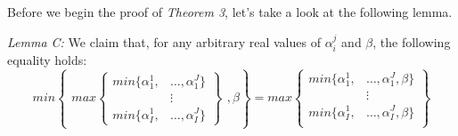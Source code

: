 \documentclass{article} %
\begin{document}
Before we begin the proof of \textit{Theorem 3}, let's take a look at the following lemma.

\textit{Lemma C:} We claim that, for any arbitrary real values of $\alpha^j_i$ and $\beta$, the following equality holds:
\[
min
\left\{
  \begin{aligned}
    max\left\{
      \begin{aligned}
        min\{\alpha_1^1,&\ldots,\alpha_1^J\} \\
        &\vdots \\
        min\{\alpha_I^1,&\ldots,\alpha_I^J\}
      \end{aligned}
    \right\}
  \end{aligned}
  , \beta
\right\}
=
max\left\{
  \begin{aligned}
    min\{\alpha_1^1,&\ldots,\alpha_1^J,\beta\} \\
    &\vdots \\
    min\{\alpha_I^1,&\ldots,\alpha_I^J,\beta\} \\
  \end{aligned}
\right\}
\]
\end{document}
